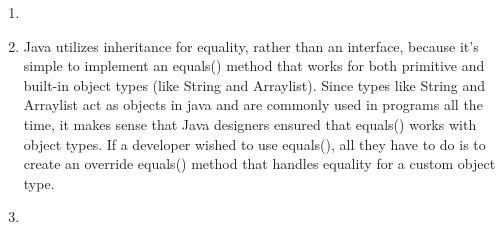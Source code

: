 \documentclass[12pt]{article}
\begin{document}
\begin{enumerate}
\item 

\item 
Java utilizes inheritance for equality, rather than an interface, because it's simple to implement an equals() method that works for both primitive and built-in object types (like String and Arraylist).
Since types like String and Arraylist act as objects in java and are commonly used in programs all the time, it makes sense that Java designers ensured that equals() works with object types. If a developer 
wished to use equals(), all they have to do is to create an override equals() method that handles equality for a custom object type.

\item 



\end{enumerate}
\end{document}
